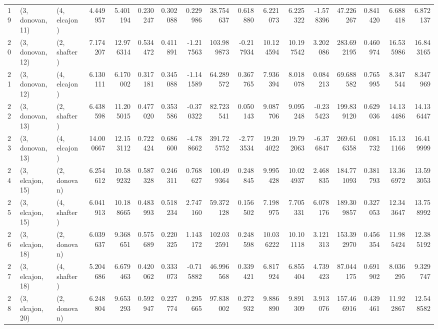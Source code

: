 \begin{tabular}{lllrrrrrrrrrrrrrr}
19 &  (3, donovan, 11) &     (4, elcajon) &   4.449957 &   5.401194 &   0.230247 &  0.302088 &   0.229986 &   38.754637 &  0.618880 &   6.221073 &   6.225322 &  -1.578396 &    47.226267 &  0.841420 &   6.688418 &   6.872137 \\
20 &  (3, donovan, 12) &     (2, shafter) &   7.174207 &  12.976314 &   0.534472 &  0.411891 &  -1.217563 &  103.989873 & -0.217934 &  10.124594 &  10.197542 &   3.202086 &   283.692195 &  0.460974 &  16.535986 &  16.843165 \\
21 &  (3, donovan, 12) &     (4, elcajon) &   6.130111 &   6.170002 &   0.317181 &  0.345088 &  -1.141589 &   64.289572 &  0.367765 &   7.936394 &   8.018078 &   0.084213 &    69.688582 &  0.765995 &   8.347544 &   8.347969 \\
22 &  (3, donovan, 13) &     (2, shafter) &   6.438598 &  11.205015 &   0.477020 &  0.353586 &  -0.370322 &   82.723541 &  0.050143 &   9.087706 &   9.095248 &  -0.235423 &   199.839120 &  0.629036 &  14.134486 &  14.136447 \\
23 &  (3, donovan, 13) &     (4, elcajon) &  14.000667 &  12.153112 &   0.722424 &  0.686600 &  -4.788662 &  391.725752 & -2.773534 &  19.204022 &  19.792063 &  -6.376847 &   269.616358 &  0.081732 &  15.131166 &  16.419999 \\
24 &  (3, elcajon, 15) &     (2, donovan) &   6.254612 &  10.589232 &   0.587328 &  0.246311 &   0.768627 &  100.499364 &  0.248845 &   9.995428 &  10.024937 &   2.468835 &   184.771093 &  0.381793 &  13.366972 &  13.593053 \\
25 &  (3, elcajon, 15) &     (4, shafter) &   6.041913 &  10.188665 &   0.483993 &  0.518234 &   2.747160 &   59.372128 &  0.156502 &   7.198975 &   7.705331 &   6.078176 &   189.309857 &  0.327053 &  12.343647 &  13.758992 \\
26 &  (3, elcajon, 18) &     (2, donovan) &   6.039637 &   9.368651 &   0.575689 &  0.220325 &   1.143172 &  102.032591 &  0.248598 &  10.036222 &  10.101118 &   3.121313 &   153.392970 &  0.456354 &  11.985424 &  12.385192 \\
27 &  (3, elcajon, 18) &     (4, shafter) &   5.204686 &   6.679463 &   0.420062 &  0.333073 &  -0.715882 &   46.996568 &  0.339421 &   6.817924 &   6.855404 &   4.739423 &    87.044175 &  0.691902 &   8.036295 &   9.329747 \\
28 &  (3, elcajon, 20) &     (2, donovan) &   6.248804 &   9.653293 &   0.592947 &  0.227774 &   0.295665 &   97.838002 &  0.272932 &   9.886890 &   9.891309 &   3.913076 &   157.466916 &  0.439461 &  11.922867 &  12.548582 \\

\end{tabular}
